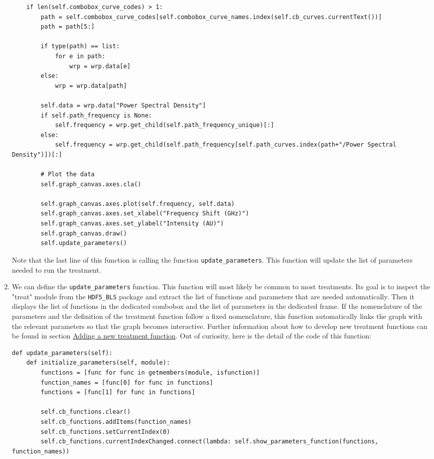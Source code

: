 \documentclass{book}
\begin{document}
\begin{enumerate}
\begin{lstlisting}
    if len(self.combobox_curve_codes) > 1:
        path = self.combobox_curve_codes[self.combobox_curve_names.index(self.cb_curves.currentText())]
        path = path[5:]

        if type(path) == list:
            for e in path:
                wrp = wrp.data[e]
        else:
            wrp = wrp.data[path]
        
        self.data = wrp.data["Power Spectral Density"]
        if self.path_frequency is None:
            self.frequency = wrp.get_child(self.path_frequency_unique)[:]
        else:
            self.frequency = wrp.get_child(self.path_frequency[self.path_curves.index(path+"/Power Spectral Density")])[:]
        
        # Plot the data
        self.graph_canvas.axes.cla()

        self.graph_canvas.axes.plot(self.frequency, self.data)
        self.graph_canvas.axes.set_xlabel("Frequency Shift (GHz)")
        self.graph_canvas.axes.set_ylabel("Intensity (AU)")
        self.graph_canvas.draw()
        self.update_parameters()
\end{lstlisting}
        Note that the last line of this function is calling the function \texttt{update\_parameters}. This function will update the list of parameters needed to run the treatment. 
        \item We can define the \texttt{update\_parameters} function. This function will most likely be common to most treatments. Its goal is to inspect the "treat" module from the \texttt{HDF5\_BLS} package and extract the list of functions and parameters that are needed automatically. Then it displays the list of functions in the dedicated combobox and the list of parameters in the dedicated frame. If the nomenclature of the parameters and the definition of the treatment function follow a fixed nomenclature, this function automatically links the graph with the relevant parameters so that the graph becomes interactive. Further information about how to develop new treatment functions can be found in section \hyperref[subsec:treatment.new]{Adding a new treatment function}. Out of curiosity, here is the detail of the code of this function:
\begin{lstlisting}
def update_parameters(self):
    def initialize_parameters(self, module):
        functions = [func for func in getmembers(module, isfunction)]
        function_names = [func[0] for func in functions]
        functions = [func[1] for func in functions]

        self.cb_functions.clear()
        self.cb_functions.addItems(function_names)
        self.cb_functions.setCurrentIndex(0)
        self.cb_functions.currentIndexChanged.connect(lambda: self.show_parameters_function(functions, function_names))


\end{lstlisting}
\end{enumerate}
\end{document}

